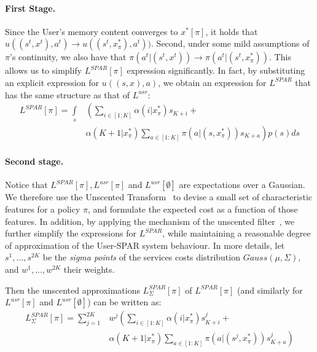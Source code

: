 \documentclass{msdm2012}
\begin{document}
\paragraph{First Stage.} Since the User's memory content converges to $x^*[\pi]$, it holds that 
$u((s^t,x^t),a^t)\rightarrow u((s^t,x^*_\pi),a^t))$. Second, under
some mild assumptions of $\pi$'s continuity, we also have that
$\pi(a^t|(s^t,x^t))\rightarrow \pi(a^t|(s^t,x^*_\pi))$. This allows us
to simplify $L^{SPAR}[\pi]$ expression significantly. In fact, by
substituting an explicit expression for $u((s,x),a)$, we obtain an
expression for $L^{SPAR}$ that has the same structure as that of
$L^{usr}$:
\begin{equation*}\begin{split}
L^{SPAR}[\pi]=\int\limits_s&\left(
\sum\limits_{i\in[1:K]}\alpha(i|x^*_\pi)s_{K+i}+\right.\\
&\left.\alpha(K+1|x^*_\pi)\sum\limits_{a\in[1:K]}\pi(a|(s,x^*_\pi))s_{K+a}
\right)p(s)ds
\end{split}
\end{equation*}

\paragraph{Second stage.} Notice that $L^{SPAR}[\pi], L^{usr}[\pi]$ and
$L^{usr}[\emptyset]$ are expectations over a Gaussian. We therefore
use the Unscented Transform~\cite{julier_uhlmann_2004} to devise a
small set of characteristic features for a policy $\pi$, and formulate
the expected cost as a function of those features. In addition, by
applying the mechanism of the unscented
filter~\cite{julier_uhlmann_2004}, we further simplify the expressions
for $L^{SPAR}$, while maintaining a reasonable degree of approximation
of the User-SPAR system behaviour. In more details, let $s^1,...,s^{2K}$
be the {\em sigma points} of the services costs distribution
$Gauss(\mu,\Sigma)$, and $w^1,...,w^{2K}$ their weights.


Then the unscented approximations $L^{SPAR}_\Sigma[\pi]$ of $L^{SPAR}[\pi]$ (and similarly for $L^{usr}[\pi]$ and $L^{usr}[\emptyset]$) can be written as:
\begin{equation*}\begin{split}
L^{SPAR}_\Sigma[\pi]=\sum\limits_{j=1}^{2K}&w^j\left(
\sum\limits_{i\in[1:K]}\alpha(i|x^*_\pi)s^j_{K+i}+\right.\\
&\left.\alpha(K+1|x^*_\pi)\sum\limits_{a\in[1:K]}\pi(a|(s^j,x^*_\pi))s^j_{K+a}
\right)
\end{split}
\end{equation*}
\end{document}
